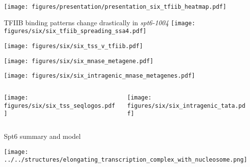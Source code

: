 \documentclass[aspectratio=169]{beamer}
\begin{document}
\begin{frame}[t]
    \centering
    \texttt{[image: figures/presentation/presentation\_six\_tfiib\_heatmap.pdf]}
\end{frame}

\begin{frame}{TFIIB binding patterns change drastically in \textit{spt6-1004}}
    \texttt{[image: figures/six/six\_tfiib\_spreading\_ssa4.pdf]}
\end{frame}

\begin{frame}
    \texttt{[image: figures/six/six\_tss\_v\_tfiib.pdf]}
\end{frame}

\begin{frame}
    \texttt{[image: figures/six/six\_mnase\_metagene.pdf]}
\end{frame}

\begin{frame}
    \texttt{[image: figures/six/six\_intragenic\_mnase\_metagenes.pdf]}
\end{frame}

\begin{frame}
    \centering
    \begin{columns}
        \begin{column}{0.5\textwidth}
            \texttt{[image: figures/six/six\_tss\_seqlogos.pdf]}
        \end{column}
        \begin{column}{0.5\textwidth}
            \texttt{[image: figures/six/six\_intragenic\_tata.pdf]}
        \end{column}
    \end{columns}
\end{frame}

\begin{frame}{Spt6 summary and model}
\end{frame}

\begin{frame}[t,plain]
    \centerline{\texttt{[image: ../../structures/elongating\_transcription\_complex\_with\_nucleosome.png]}}
\end{frame}
\end{document}
